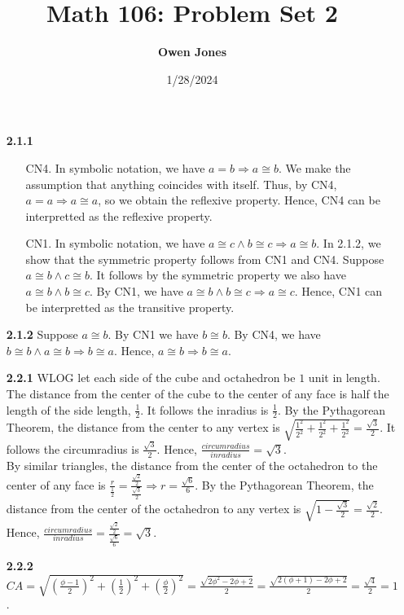 \documentclass[10pt]{article}
\title{\bf Math 106: Problem Set 2}
\date{1/28/2024}
\author{\bf Owen Jones}
\begin{document}
\maketitle
\begin{enumerate}
    \item [\textbf{2.1.1}] \begin{enumerate}
        \item [CN4.] In symbolic notation, we have $a=b\Rightarrow a\cong b$. 
        We make the assumption that anything coincides with itself. 
        Thus, by CN4, $a=a\Rightarrow a\cong a$, so we obtain the reflexive property. 
        Hence, CN4 can be interpretted as the reflexive property.
        \item [CN1.] In symbolic notation, we have $a\cong c\land b\cong c\Rightarrow a\cong b$. 
        In 2.1.2, we show that the symmetric property follows from CN1 and CN4. 
        Suppose $a\cong b\land c\cong b$. 
        It follows by the symmetric property we also have $a\cong b\land b\cong c$. 
        By CN1, we have $a\cong b\land b\cong c\Rightarrow a\cong c$.
        Hence, CN1 can be interpretted as the transitive property.
    \end{enumerate}
    \item [\textbf{2.1.2}] Suppose $a\cong b$. 
    By CN1 we have $b\cong b$. 
    By CN4, we have $b\cong b\land a\cong b\Rightarrow b\cong a$.
    Hence, $a\cong b\Rightarrow b\cong a$.
    \item [\textbf{2.2.1}] WLOG let each side of the cube and octahedron be $1$ unit in length. 
    The distance from the center of the cube to the center of any face is half the length of the side length, $\frac{1}{2}$.
    It follows the inradius is $\frac{1}{2}$. 
    By the Pythagorean Theorem, the distance from the center to any vertex is $\sqrt{\frac{1^2}{2^2}+\frac{1^2}{2^2}+\frac{1^2}{2^2}}=\frac{\sqrt{3}}{2}$.
    It follows the circumradius is $\frac{\sqrt{3}}{2}$.
    Hence, $\frac{circumradius}{inradius}=\sqrt{3}$.\\
    By similar triangles, the distance from the center of the octahedron to the center of any face is $\frac{r}{\frac{1}{2}}=\frac{\frac{\sqrt{2}}{2}}{\frac{\sqrt{3}}{2}}\Rightarrow r=\frac{\sqrt{6}}{6}$.
    By the Pythagorean Theorem, the distance from the center of the octahedron to any vertex is $\sqrt{1-\frac{\sqrt{3}}{2}}=\frac{\sqrt{2}}{2}$.
    Hence, $\frac{circumradius}{inradius}=\frac{\frac{\sqrt{2}}{2}}{\frac{\sqrt{6}}{6}}=\sqrt{3}$.
    \item [\textbf{2.2.2}] $CA=\sqrt{{(\frac{\phi-1}{2})}^2+{(\frac{1}{2})}^2+{(\frac{\phi}{2})}^2}=\frac{\sqrt{2\phi^2-2\phi+2}}{2}=\frac{\sqrt{2(\phi+1)-2\phi+2}}{2}=\frac{\sqrt{4}}{2}=1$.\\

\end{enumerate}
\end{document}
